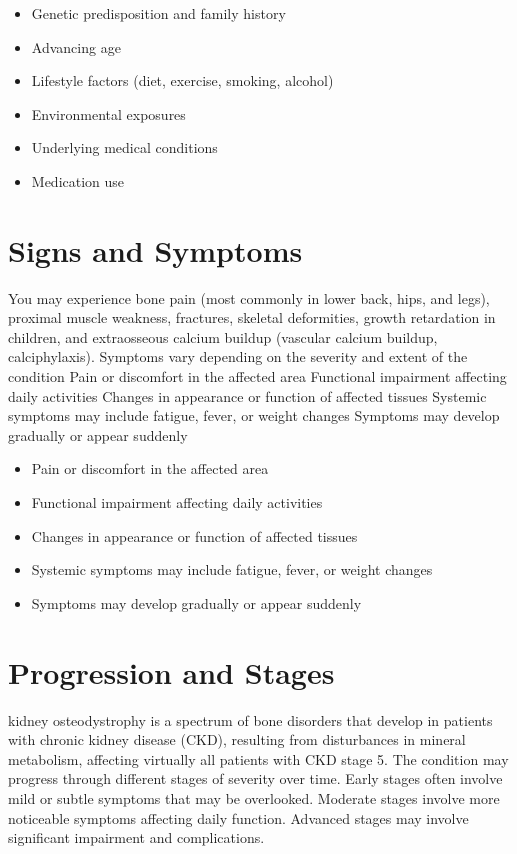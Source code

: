 \begin{itemize}[noitemsep]
  \item Genetic predisposition and family history
  \item Advancing age
  \item Lifestyle factors (diet, exercise, smoking, alcohol)
  \item Environmental exposures
  \item Underlying medical conditions
  \item Medication use
\end{itemize}
\section{Signs and Symptoms}
You may experience bone pain (most commonly in lower back, hips, and legs), proximal muscle weakness, fractures, skeletal deformities, growth retardation in children, and extraosseous calcium buildup (vascular calcium buildup, calciphylaxis). Symptoms vary depending on the severity and extent of the condition Pain or discomfort in the affected area Functional impairment affecting daily activities Changes in appearance or function of affected tissues Systemic symptoms may include fatigue, fever, or weight changes Symptoms may develop gradually or appear suddenly

\begin{itemize}[noitemsep]
  \item Pain or discomfort in the affected area
  \item Functional impairment affecting daily activities
  \item Changes in appearance or function of affected tissues
  \item Systemic symptoms may include fatigue, fever, or weight changes
  \item Symptoms may develop gradually or appear suddenly
\end{itemize}
\section{Progression and Stages}
kidney osteodystrophy is a spectrum of bone disorders that develop in patients with chronic kidney disease (CKD), resulting from disturbances in mineral metabolism, affecting virtually all patients with CKD stage 5. The condition may progress through different stages of severity over time. Early stages often involve mild or subtle symptoms that may be overlooked. Moderate stages involve more noticeable symptoms affecting daily function. Advanced stages may involve significant impairment and complications.
